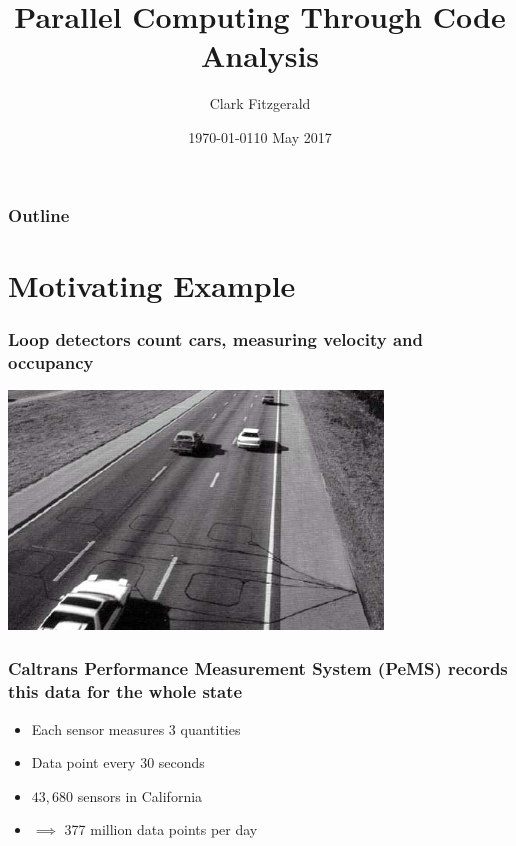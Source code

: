 \documentclass{beamer}
\begin{document}
\title{Parallel Computing Through Code Analysis}
\date{\today}
\date{10 May 2017}
\author{Clark Fitzgerald}

\frame{\titlepage}

\begin{frame}
    \frametitle{Outline}
    \tableofcontents
\end{frame}

\section{Motivating Example}
\begin{frame}

    \frametitle{Loop detectors count cars, measuring velocity and
    occupancy}

\centerline{\includegraphics[height=2.5in]{loop_detector.jpg}}

\end{frame}
\begin{frame}

\frametitle{Caltrans Performance Measurement System (PeMS) records this
data for the whole state}

    \begin{itemize}
        \item Each sensor measures 3 quantities
        \item Data point every 30 seconds
        \item $43,680$ sensors in California
        \item $\implies$  377 million data points per day
    \end{itemize}

\end{frame}
\end{document}
